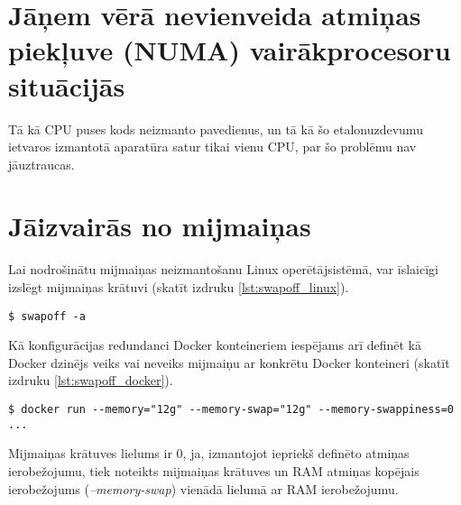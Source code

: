 \section{Jāņem vērā nevienveida atmiņas piekļuve (NUMA) vairākprocesoru situācijās}
Tā kā CPU puses kods neizmanto pavedienus, un tā kā šo etalonuzdevumu ietvaros
izmantotā aparatūra satur tikai vienu CPU, par šo problēmu nav jāuztraucas.


\section{Jāizvairās no mijmaiņas}
Lai nodrošinātu mijmaiņas neizmantošanu Linux operētājsistēmā, var īslaicīgi
izslēgt mijmaiņas krātuvi (skatīt izdruku \ref{lst:swapoff_linux}).
\begin{lstlisting}[caption={Mijmaiņas krātuves izslēgšana Linux operētājsistēmā},
  captionpos=b,
    label=lst:swapoff_linux]
$ swapoff -a
\end{lstlisting}

Kā konfigurācijas redundanci Docker konteineriem iespējams arī definēt kā 
Docker dzinējs veiks vai neveiks mijmaiņu ar konkrētu Docker konteineri (skatīt
izdruku \ref{lst:swapoff_docker}).

\begin{lstlisting}[caption={Mijmaiņas krātuves izlēgšana Docker konteinerim},
    label=lst:swapoff_docker,
  captionpos=b
    ]
$ docker run --memory="12g" --memory-swap="12g" --memory-swappiness=0 ...
\end{lstlisting}
Mijmaiņas krātuves lielums ir 0, ja, izmantojot iepriekš definēto atmiņas
ierobežojumu, tiek noteikts mijmaiņas krātuves un RAM atmiņas kopējais
ierobežojums (\textit{--memory-swap}) vienādā lielumā ar RAM ierobežojumu.

